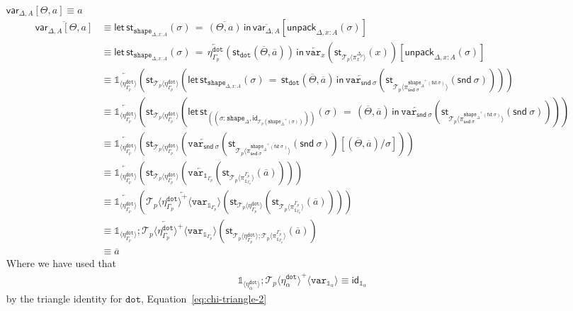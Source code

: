 \documentclass[10pt]{article}
\theoremstyle{definition}
\newcommand\dsd[1]{\ensuremath{\mathsf{#1}}}
\newcommand{\app}[2]{\ensuremath{#1 \: #2}}
\newcommand{\sigmacl}[3]{\ensuremath{(#1{:}#2,#3)}}
\newcommand{\fst}[1]{\app{\dsd{fst}}{#1}}
\newcommand{\snd}[1]{\app{\dsd{snd}}{#1}}
\newcommand{\id}{\mathsf{id}}
\newcommand{\rewrite}[2]{\overleftarrow{#1}(#2)}
\newcommand\StI[2]{\ensuremath{\mathsf{st}_{#1}(#2)}}
\newcommand\StE[4]{\ensuremath{\mathsf{let} \, \StI{#1}{#3} \, = \, {#2} \, \mathsf{in} \, #4}}
\newcommand\TrPlus[2]{\ensuremath{{#1}^+(#2)}}
\newcommand\El[2]{\mathcal{T}_{#1}(#2)}
\newcommand\ApEl[2]{\mathcal{T}_{#1}\langle#2\rangle}
\newcommand\ApPlus[2]{\ensuremath{{#1}^+ \langle #2 \rangle }}
\newcommand\unpack[2]{\ensuremath{\mathsf{unpack}_{#1}(#2)}}
\newcommand{\modeof}[1]{{#1}_p}
\newcommand{\tdot}{\ensuremath{\mathtt{dot}}}
\newcommand{\tshape}[1]{\ensuremath{\mathtt{shape}_{#1}}}
\newcommand{\upstairs}[1]{\overline{#1}}
\newcommand\qvar[1]{\ensuremath{\mathsf{var}_{#1}}}
\newcommand\One{\ensuremath{\mathds{1}}}
\newcommand\var[1]{\ensuremath{\mathtt{var}_{#1}}}
\newcommand\ApOne[1]{\ensuremath{\One_{\langle {#1} \rangle }}}
\begin{document}
\begin{enumerate}[style = multiline, labelwidth = 80pt]
\item[{$\qvar{\Delta,A}[\Theta, a] \equiv a$}]
\begin{align*}
\upstairs{\qvar{\Delta,A}[\Theta, a]}
&\equiv \StE{\tshape{\Delta, x : A}}{\upstairs{(\Theta, a)}}{\sigma}{\upstairs{\qvar{\Delta,A}}[\unpack{\Delta, x : A}{\sigma}]} \\
&\equiv \StE{\tshape{\Delta, x : A}}{\rewrite{\eta^\tdot_{\modeof{\Gamma}}}{\StI{\tdot}{\upstairs{\Theta}, \upstairs{a}}}}{\sigma}{\rewrite{\var{x}}{\StI{\ApEl{p}{\pi^{\modeof{\Delta}}_x}}{x}}[\unpack{\Delta, x : A}{\sigma}]} \\
&\equiv \rewrite{\ApOne{\eta^\tdot_{\modeof{\Gamma}}}}{\StI{\ApEl{p}{\eta^\tdot_{\modeof{\Gamma}}}}{\StE{\tshape{\Delta, x : A}}{\StI{\tdot}{\upstairs{\Theta}, \upstairs{a}}}{\sigma}{\rewrite{\var{\snd \sigma}}{\StI{\ApEl{p}{\pi^{\TrPlus{\tshape{\Delta}}{\fst \sigma}}_{\snd \sigma}}}{\snd \sigma}}}}} \\
&\equiv \rewrite{\ApOne{\eta^\tdot_{\modeof{\Gamma}}}}{\StI{\ApEl{p}{\eta^\tdot_{\modeof{\Gamma}}}}{\StE{(\sigmacl{\sigma}{\tshape{\Delta}}{\id_{\El{p}{\TrPlus{\tshape{\Delta}}{\sigma}}}})}{(\upstairs{\Theta}, \upstairs{a})}{\sigma}{\rewrite{\var{\snd \sigma}}{\StI{\ApEl{p}{\pi^{\TrPlus{\tshape{\Delta}}{\fst \sigma}}_{\snd \sigma}}}{\snd \sigma}}}}} \\
&\equiv \rewrite{\ApOne{\eta^\tdot_{\modeof{\Gamma}}}}{\StI{\ApEl{p}{\eta^\tdot_{\modeof{\Gamma}}}}{\rewrite{\var{\snd \sigma}}{\StI{\ApEl{p}{\pi^{\TrPlus{\tshape{\Delta}}{\fst \sigma}}_{\snd \sigma}}}{\snd \sigma}}[(\upstairs{\Theta}, \upstairs{a})/\sigma]}} \\
&\equiv \rewrite{\ApOne{\eta^\tdot_{\modeof{\Gamma}}}}{\StI{\ApEl{p}{\eta^\tdot_{\modeof{\Gamma}}}}{\rewrite{\var{\One_{\modeof{\Gamma}}}}{\StI{\ApEl{p}{\pi^{\modeof{\Gamma}}_{\One_{\modeof{\Gamma}}}}}{\upstairs{a}}}}} \\
&\equiv \rewrite{\ApOne{\eta^\tdot_{\modeof{\Gamma}}}}{\rewrite{\ApPlus{\ApEl{p}{\eta^\tdot_{\modeof{\Gamma}}}}{\var{\One_{\modeof{\Gamma}}}}}{\StI{\ApEl{p}{\eta^\tdot_{\modeof{\Gamma}}}}{\StI{\ApEl{p}{\pi^{\modeof{\Gamma}}_{\One_{\modeof{\Gamma}}}}}{\upstairs{a}}}}} \\
&\equiv \rewrite{\ApOne{\eta^\tdot_{\modeof{\Gamma}}};\ApPlus{\ApEl{p}{\eta^\tdot_{\modeof{\Gamma}}}}{\var{\One_{\modeof{\Gamma}}}}}{\StI{\ApEl{p}{\eta^\tdot_{\modeof{\Gamma}}};\ApEl{p}{\pi^{\modeof{\Gamma}}_{\One_{\modeof{\Gamma}}}}}{\upstairs{a}}} \\
&\equiv \upstairs{a}
\end{align*}
Where we have used that
\begin{align*}
\ApOne{\eta^\tdot_\alpha};\ApPlus{\ApEl{p}{\eta^\tdot_\alpha}}{\var{\One_\alpha}} \equiv \id_{\One_\alpha}
\end{align*}
by the triangle identity for $\tdot$, Equation~\eqref{eq:chi-triangle-2}


\end{enumerate}
\end{document}
